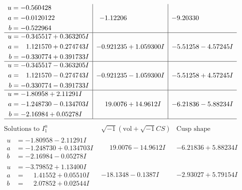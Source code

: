 \documentclass[1p]{elsarticle_modified}
\theoremstyle{definition}
\newcommand{\I}{\sqrt{-1}}
\begin{document}
$$\begin{array}{c|c|c}
\begin{aligned}
u &= -0.560428\phantom{ +0.000000I} \\
a &= -0.0120122\phantom{ +0.000000I} \\
b &= -0.522964\phantom{ +0.000000I}\end{aligned}
 & -1.12206\phantom{ +0.000000I} & -9.20330\phantom{ +0.000000I} \\ \hline\begin{aligned}
u &= -0.345517 + 0.363205 I \\
a &= \phantom{-}1.121570 + 0.274743 I \\
b &= -0.330774 + 0.391733 I\end{aligned}
 & -0.921235 + 1.059300 I & -5.51258 - 4.57245 I \\ \hline\begin{aligned}
u &= -0.345517 - 0.363205 I \\
a &= \phantom{-}1.121570 - 0.274743 I \\
b &= -0.330774 - 0.391733 I\end{aligned}
 & -0.921235 - 1.059300 I & -5.51258 + 4.57245 I \\ \hline\begin{aligned}
u &= -1.80958 + 2.11291 I \\
a &= -1.248730 - 0.134703 I \\
b &= -2.16984 + 0.05278 I\end{aligned}
 & \phantom{-}19.0076 + 14.9612 I & -6.21836 - 5.88234 I\\
 \hline 
 \end{array}$$\newpage$$\begin{array}{c|c|c}  
\text{Solutions to }I^u_{1}& \I (\text{vol} + \sqrt{-1}CS) & \text{Cusp shape}\\
 \hline 
\begin{aligned}
u &= -1.80958 - 2.11291 I \\
a &= -1.248730 + 0.134703 I \\
b &= -2.16984 - 0.05278 I\end{aligned}
 & \phantom{-}19.0076 - 14.9612 I & -6.21836 + 5.88234 I \\ \hline\begin{aligned}
u &= -3.79852 + 1.13400 I \\
a &= \phantom{-}1.41552 + 0.05510 I \\
b &= \phantom{-}2.07852 + 0.02544 I\end{aligned}
 & -18.1348 - 0.1387 I & -2.93027 + 5.79154 I \\ \hline\begin{aligned}

\end{aligned}
\end{array}$$
\end{document}
